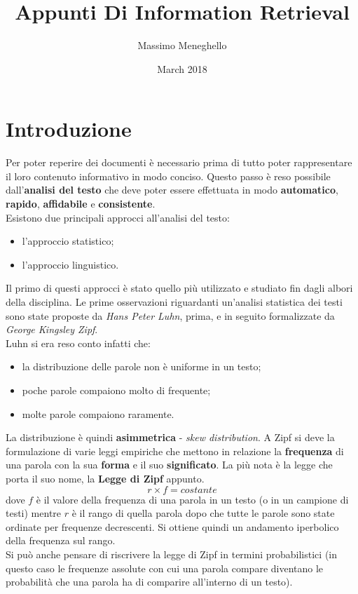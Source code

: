 \documentclass{article}
\title{Appunti Di Information Retrieval}
\author{Massimo Meneghello}
\date{March 2018}
\begin{document}
\maketitle

\section{Introduzione}
Per poter reperire dei documenti è necessario prima di tutto poter rappresentare il loro contenuto informativo in modo conciso. Questo passo è reso possibile dall'\textbf{analisi del testo} che deve poter essere effettuata in modo \textbf{automatico}, \textbf{rapido}, \textbf{affidabile} e \textbf{consistente}.\\
Esistono due principali approcci all'analisi del testo:
\begin{itemize}
\item l'approccio statistico;
\item l'approccio linguistico.
\end{itemize}
Il primo di questi approcci è stato quello più utilizzato e studiato fin dagli albori della disciplina. Le prime osservazioni riguardanti un'analisi statistica dei testi sono state proposte da \textit{Hans Peter Luhn}, prima, e in seguito formalizzate da \textit{George Kingsley Zipf}.\\
Luhn si era reso conto infatti che:
\begin{itemize}
\item la distribuzione delle parole non è uniforme in un testo;
\item poche parole compaiono molto di frequente;
\item molte parole compaiono raramente.
\end{itemize}
La distribuzione è quindi \textbf{asimmetrica} - \textit{skew distribution}.
A Zipf si deve la formulazione di varie leggi empiriche che mettono in relazione la \textbf{frequenza} di una parola con la sua \textbf{forma} e il suo \textbf{significato}. La più nota è la legge che porta il suo nome, la \textbf{Legge di Zipf} appunto.
\begin{equation}
r \times f = costante
\end{equation}
dove $f$ è il valore della frequenza di una parola in un testo (o in un campione di testi) mentre $r$ è il rango di quella parola dopo che tutte le parole sono state ordinate per frequenze decrescenti. Si ottiene quindi un andamento iperbolico della frequenza sul rango.\\
Si può anche pensare di riscrivere la legge di Zipf in termini probabilistici (in questo caso le frequenze assolute con cui una parola compare diventano le probabilità che una parola ha di comparire all'interno di un testo).\\
\end{document}
